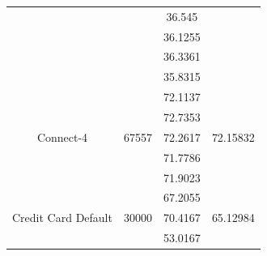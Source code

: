 \documentclass[12pt]{article}
\begin{document}
\begin{table}[H]
\begin{tabular}{|c|c|c|c|}
		&                         & 36.545                                                                                           &                             \\ \cline{3-3}
		&                         & 36.1255                                                                                          &                             \\ \cline{3-3}
		&                         & 36.3361                                                                                          &                             \\ \cline{3-3}
		&                         & 35.8315                                                                                          &                             \\ \hline
		\multirow{5}{*}{Connect-4}           & \multirow{5}{*}{67557}  & 72.1137                                                                                          & \multirow{5}{*}{72.15832}   \\ \cline{3-3}
		&                         & 72.7353                                                                                          &                             \\ \cline{3-3}
		&                         & 72.2617                                                                                          &                             \\ \cline{3-3}
		&                         & 71.7786                                                                                          &                             \\ \cline{3-3}
		&                         & 71.9023                                                                                          &                             \\ \hline
		\multirow{5}{*}{Credit Card Default} & \multirow{5}{*}{30000}  & 67.2055                                                                                          & \multirow{5}{*}{65.12984}   \\ \cline{3-3}
		&                         & 70.4167                                                                                          &                             \\ \cline{3-3}
		&                         & 53.0167                                                                                          &                             \\ \cline{3-3}

\end{tabular}
\end{table}
\end{document}
